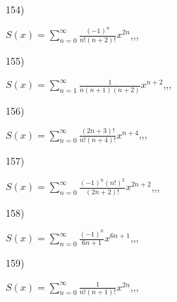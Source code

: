 \documentclass[11pt, ukrainian]{article}
\begin{document}
\par
\vspace{0.9cm}
154) \space 
{%
{$S(x)=\sum\limits_{n=0}^{\infty}{\frac{(-1)^n}{n!(n+2)!}}{x^{{2n}}}$},,, \par \smallskip  
}
\par
\vspace{0.9cm}
155) \space 
{%
{$S(x)=\sum\limits_{n=1}^{\infty}{\frac{1}{n(n+1)(n+2)}}{x^{{n+2}}}$},,, \par \smallskip  
}
\par
\vspace{0.9cm}
156) \space 
{%
{$S(x)=\sum\limits_{n=0}^{\infty}{\frac{(2n+3)!}{n!(n+4)!}}{x^{{n+4}}}$},,, \par \smallskip  
}
\par
\vspace{0.9cm}
157) \space 
{%
{$S(x)=\sum\limits_{n=0}^{\infty}{\frac{{(-1)^n}{(n!)^2}}{(2n+2)!}}{x^{{2n+2}}}$},,, \par \smallskip  
}
\par
\vspace{0.9cm}
158) \space 
{%
{$S(x)=\sum\limits_{n=0}^{\infty}{\frac{(-1)^n}{6n+1}}{x^{{6n+1}}}$},,, \par \smallskip  
}
\par
\vspace{0.9cm}
159) \space 
{%
{$S(x)=\sum\limits_{n=0}^{\infty}{\frac{1}{n!(n+1)!}}{x^{{2n}}}$},,, \par \smallskip  
}
\end{document}
